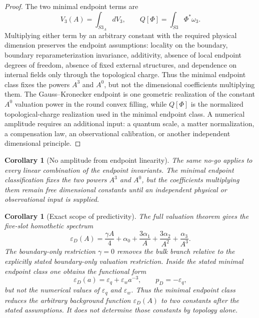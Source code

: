 \documentclass[11pt,a4paper]{article}
\def\Sthree{S3}%
\def\dd{d}%
\numberwithin{equation}{section}
\newtheorem{corollary}[criterion]{Corollary}
\theoremstyle{remark}
\newcommand{\Sthree}{S^3}
\newcommand{\epsD}{\varepsilon_D}
\newcommand{\pD}{p_D}
\newcommand{\dd}{\mathrm{d}}
\begin{document}
\begin{proof}
The two minimal endpoint terms are
\begin{equation}
V_3(A)=\int_{\Sthree_A}\dd V_3,
\qquad
Q[\Phi]=\int_{\Sthree}\Phi^*\omega_3 .
\end{equation}
Multiplying either term by an arbitrary constant with the required physical dimension preserves the endpoint assumptions: locality on the boundary, boundary reparameterization invariance, additivity, absence of local endpoint degrees of freedom, absence of fixed external structures, and dependence on internal fields only through the topological charge. Thus the minimal endpoint class fixes the powers \(A^3\) and \(A^0\), but not the dimensional coefficients multiplying them. The Gauss--Kronecker endpoint is one geometric realization of the constant \(A^0\) valuation power in the round convex filling, while \(Q[\Phi]\) is the normalized topological-charge realization used in the minimal endpoint class. A numerical amplitude requires an additional input: a quantum scale, a matter normalization, a compensation law, an observational calibration, or another independent dimensional principle.
\end{proof}

\begin{corollary}[No amplitude from endpoint linearity]
The same no-go applies to every linear combination of the endpoint invariants. The minimal endpoint classification fixes the two powers \(A^3\) and \(A^0\), but the coefficients multiplying them remain free dimensional constants until an independent physical or observational input is supplied.
\end{corollary}

\begin{corollary}[Exact scope of predictivity]
The full valuation theorem gives the five-slot homothetic spectrum
\begin{equation}
\epsD(A)=\frac{\gamma A}{4}+\alpha_0+\frac{3\alpha_1}{A}+\frac{3\alpha_2}{A^2}+\frac{\alpha_3}{A^3}.
\end{equation}
The boundary-only restriction \(\gamma=0\) removes the bulk branch relative to the explicitly stated boundary-only valuation restriction. Inside the stated minimal endpoint class one obtains the functional form
\begin{equation}
\epsD(a)=\varepsilon_q+\varepsilon_w a^{-3},
\qquad
\pD=-\varepsilon_q,
\end{equation}
but not the numerical values of \(\varepsilon_q\) and \(\varepsilon_w\). Thus the minimal endpoint class reduces the arbitrary background function \(\epsD(A)\) to two constants after the stated assumptions. It does not determine those constants by topology alone.
\end{corollary}
\end{document}
